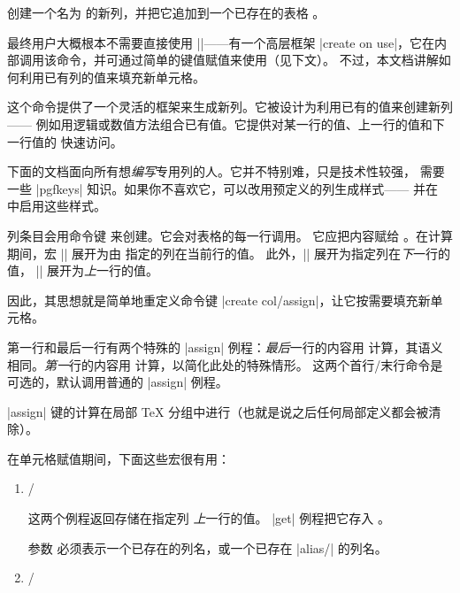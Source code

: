 \documentclass[a4paper,doc2]{ltxdoc}
\begin{document}
\begin{command}{\pgfplotstablecreatecol{}}
    创建一个名为  的新列，并把它追加到一个已存在的表格
    。

    最终用户大概根本不需要直接使用 |\pgfplotstablecreatecol|——有一个高层框架
    |create on use|，它在内部调用该命令，并可通过简单的键值赋值来使用（见下文）。
    不过，本文档讲解如何利用已有列的值来填充新单元格。

    这个命令提供了一个灵活的框架来生成新列。它被设计为利用已有的值来创建新列——
    例如用逻辑或数值方法组合已有值。它提供对某一行的值、上一行的值和下一行值的
    快速访问。

    下面的文档面向所有想\emph{编写}专用列的人。它并不特别难，只是技术性较强，
    需要一些 |pgfkeys| 知识。如果你不喜欢它，可以改用预定义的列生成样式——
    并在  中启用这些样式。

    列条目会用命令键  来创建。它会对表格的每一行调用。
    它应把内容赋给 。在计算期间，宏
    |\thisrow| 展开为由  指定的列在当前行的值。
    此外，|\nextrow| 展开为指定列在\emph{下}一行的值，
    |\prevrow| 展开为\emph{上}一行的值。

    因此，其思想就是简单地重定义命令键 |create col/assign|，让它按需要填充新单元格。

    第一行和最后一行有两个特殊的 |assign| 例程：\emph{最后}一行的内容用
     计算，其语义相同。\emph{第一}行的内容用
     计算，以简化此处的特殊情形。
    这两个首行/末行命令是可选的，默认调用普通的 |assign| 例程。

    |assign| 键的计算在局部 \TeX{} 分组中进行（也就是说之后任何局部定义都会被清除）。

    在单元格赋值期间，下面这些宏很有用：
    \begin{enumerate}
        \item \declareandlabel{\prevrow} /
            \declareandlabel{\getprevrow}

            这两个例程返回存储在指定列  \emph{上}一行的值。
            |get| 例程把它存入 。

            参数  必须表示一个已存在的列名，或一个已存在
            |alias/| 的列名。
        \item \declareandlabel{\thisrow} /
            \declareandlabel{\getthisrow}


\end{enumerate}
\end{command}
\end{document}
